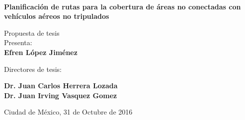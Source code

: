 \documentclass[letter]{letter}
\begin{document}
	\begin{minipage}[c][0.8\textheight][c]{0.2\textwidth}
		\begin{center}
			\hskip2pt
			\vrule width2.5pt height17cm 
			\hskip1mm
			\vrule width1pt height17cm \\     	
			\end{center}
	\end{minipage}
	\begin{minipage}[c][0.6\textheight][c]{0.65\textwidth}
	\begin{center}
	
	{\Large \textbf{Planificación de rutas para la cobertura de  áreas no conectadas con vehículos a\'ereos no tripulados}}
	\vspace{1cm}
	
	{\large {Propuesta de tesis}}\\[40pt]            
	Presenta:\\[5pt]
	\textbf{{Efren L\'opez Jim\'enez}}
	
	\vspace{1cm}
	
	{\small Directores de tesis:}
	
	{\large \textbf{Dr. Juan Carlos Herrera Lozada
	\\Dr. Juan Irving Vasquez Gomez}}
	
	\vspace{2cm}
	
	{Ciudad de México,}{ }{31 de Octubre de 2016}
	\end{center}
	\end{minipage}
\end{document}
